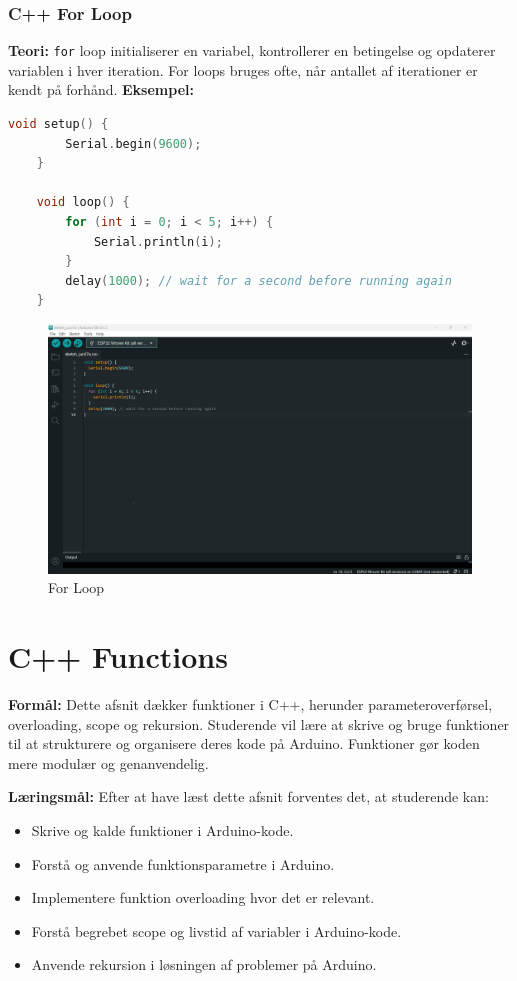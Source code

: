 \subsubsection{C++ For Loop}
\textbf{Teori:} \texttt{for} loop initialiserer en variabel, kontrollerer en betingelse og opdaterer variablen i hver iteration. For loops bruges ofte, når antallet af iterationer er kendt på forhånd.
\newline\newline
\noindent\textbf{Eksempel:}
\begin{lstlisting}[language=C++]
	void setup() {
		Serial.begin(9600);
	}
	
	void loop() {
		for (int i = 0; i < 5; i++) {
			Serial.println(i);
		}
		delay(1000); // wait for a second before running again
	}
\end{lstlisting}
\begin{figure}[h!]
	\centering
	\includegraphics[width=\textwidth]{fig/fig10.png}
	\caption{For Loop}
	\label{fig:10}
\end{figure}

\section{C++ Functions}
\textbf{Formål:} Dette afsnit dækker funktioner i C++, herunder parameteroverførsel, overloading, scope og rekursion. Studerende vil lære at skrive og bruge funktioner til at strukturere og organisere deres kode på Arduino. Funktioner gør koden mere modulær og genanvendelig.

\textbf{Læringsmål:} Efter at have læst dette afsnit forventes det, at studerende kan:
\begin{itemize}
	\item Skrive og kalde funktioner i Arduino-kode.
	\item Forstå og anvende funktionsparametre i Arduino.
	\item Implementere funktion overloading hvor det er relevant.
	\item Forstå begrebet scope og livstid af variabler i Arduino-kode.
	\item Anvende rekursion i løsningen af problemer på Arduino.
\end{itemize}

